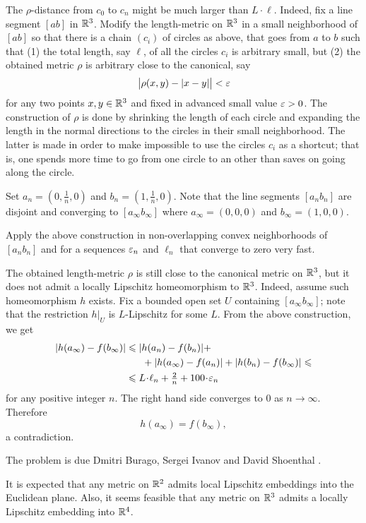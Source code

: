The $\rho$-distance from $c_0$ to $c_n$ might be much larger than $L\cdot\ell$.
Indeed, fix a line segment $[ab]$ in $\mathbb{R}^3$.
Modify 
the length-metric on $\mathbb{R}^3$ in a small neighborhood of $[ab]$
so that there is a chain $(c_i)$ of circles as above,
that goes from $a$ to $b$ 
such that
(1) the total length, say $\ell$, 
of all the circles $c_i$ is arbitrary small,
but 
(2) the obtained metric $\rho$ 
is arbitrary close to the canonical, say
\[\bigl|\rho(x,y)-|x-y|\bigr|<\varepsilon\]
for any two points $x,y\in\mathbb{R}^3$
and fixed in advanced small value $\varepsilon>0$.
The construction of $\rho$ 
is done by shrinking the length of each circle
and expanding the length in the normal directions  
to the circles in their small neighborhood.
The latter is made in order to make impossible to use the circles $c_i$ as a shortcut;
that is, one spends more time to go from one circle to an other 
than saves on going along the circle.

Set $a_n=(0,\tfrac1n,0)$ and $b_n=(1,\tfrac1n,0)$.
Note that the line segments $[a_nb_n]$ are disjoint and converging
to $[a_\infty b_\infty]$
where $a_\infty=(0,0,0)$ and $b_\infty=(1,0,0)$.

Apply the above construction in non-overlapping convex neighborhoods of $[a_nb_n]$ 
and for a sequences 
$\varepsilon_n$ and $\ell_n$ 
that converge to zero very fast.

The obtained length-metric $\rho$ is still close to the canonical metric on $\mathbb{R}^3$,
but it does not admit 
a locally Lipschitz homeomorphism to $\mathbb{R}^3$.
Indeed, 
assume such homeomorphism $h$ exists.
Fix a bounded open set $U$ containing $[a_\infty b_\infty]$;
note that the restriction $h|_U$ is $L$-Lipschitz for some $L$.
From the above construction,
we get 
\begin{align*}
|h(a_\infty)-f(b_\infty)|
&\le 
|h(a_n)-f(b_n)|
+
\\
&\ \ \ \ \ +
|h(a_\infty)-f(a_n)|
+
|h(b_n)-f(b_\infty)|
\le
\\
&\le
L\cdot\ell_n+\tfrac2n+100\cdot\eps_n
\end{align*}
for any positive integer $n$.
The right hand side converges to $0$ as $n\to\infty$.
Therefore 
\[h(a_\infty)=f(b_\infty),\] 
a contradiction.\qeds



The problem is due
Dmitri Burago, 
Sergei Ivanov 
and David Shoenthal \cite[see][]{BIS}.

It is expected that any metric on $\mathbb{R}^2$ admits local Lipschitz embeddings into the Euclidean plane.
Also, it seems feasible that any metric on $\mathbb{R}^3$ admits a locally Lipschitz embedding into $\mathbb{R}^4$.

